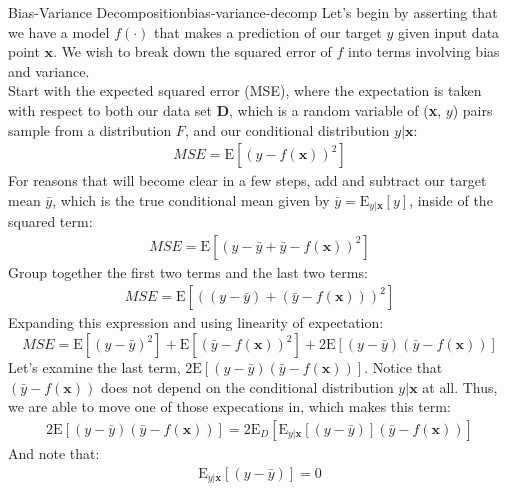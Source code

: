 \begin{derivation}{Bias-Variance Decomposition}{bias-variance-decomp}
    Let's begin by asserting that we have a model $f(\cdot)$ that makes a prediction of our target $y$ given input data point $\textbf{x}$. We wish to break down the squared error of $f$ into terms involving bias and variance. \\

    Start with the expected squared error (MSE), where the expectation is taken with respect to both our data set $\textbf{D}$, which is a random variable of (\textbf{x}, $y$) pairs sample from a distribution $F$, and our conditional distribution $y | \textbf{x}$:
    \begin{align*}
        \textit{MSE} = \mathrm{E}[(y - f(\textbf{x}))^{2}]
    \end{align*}
    For reasons that will become clear in a few steps, add and subtract our target mean $\bar{y}$, which is the true conditional mean given by $\bar{y} = \mathrm{E}_{y|\textbf{x}}[y]$, inside of the squared term:
    \begin{align*}
        \textit{MSE} = \mathrm{E}[(y - \bar{y} + \bar{y} - f(\textbf{x}))^{2}]
    \end{align*}
    Group together the first two terms and the last two terms:
    \begin{align*}
        \textit{MSE} = \mathrm{E}[((y - \bar{y}) + (\bar{y} - f(\textbf{x})))^{2}]
    \end{align*}
    Expanding this expression and using linearity of expectation:
    \begin{equation} \label{bias-variance-intermediate-1}
        \textit{MSE} = \mathrm{E}[(y - \bar{y})^{2}] + \mathrm{E}[(\bar{y} - f(\textbf{x}))^{2}] + 2\mathrm{E}[(y - \bar{y})(\bar{y} - f(\textbf{x}))]
    \end{equation}
    Let's examine the last term, $2\mathrm{E}[(y - \bar{y})(\bar{y} - f(\textbf{x}))]$. Notice that $(\bar{y} - f(\textbf{x}))$ does not depend on the conditional distribution $y|\textbf{x}$ at all. Thus, we are able to move one of those expecations in, which makes this term:
    \begin{align*}
        2\mathrm{E}[(y - \bar{y})(\bar{y} - f(\textbf{x}))] = 2\mathrm{E}_{D}[\mathrm{E}_{y|\textbf{x}}[(y - \bar{y})](\bar{y} - f(\textbf{x}))]
    \end{align*}
    And note that:
    \begin{align*}
        \mathrm{E}_{y|\textbf{x}}[(y - \bar{y})] = 0
    \end{align*}

\end{derivation}
